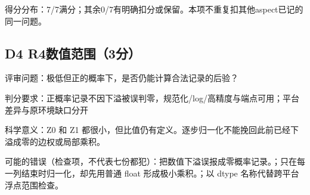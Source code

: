 \documentclass[11pt,a4paper]{article}
\begin{document}
得分分布：7/7满分；其余0/7有明确扣分或保留。本项不重复扣其他aspect已记的同一问题。

\clearpage
\subsection{D4 R4数值范围（3分）}
\label{aspect:D4}
评审问题：极低但正的概率下，是否仍能计算合法记录的后验？

判分要求：正概率记录不因下溢被误判零，规范化/log/高精度与端点可用；平台差异与原环境缺口分开

科学意义：Z0 和 Z1 都很小，但比值仍有定义。逐步归一化不能挽回此前已经下溢成零的边权或局部乘积。

可能的错误（检查项，不代表七份都犯）：把数值下溢误报成零概率记录。；只在每一列结束时归一化，却先用普通 float 形成极小乘积。；以 dtype 名称代替跨平台浮点范围检查。
\end{document}
